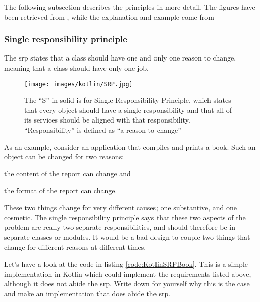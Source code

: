The following subsection describes the principles in more detail.
The figures have been retrieved from \cite{Devilla2009}, while the explanation and example come from \cite{OODesigncom2018,Janssen2018,Laanaya2016,Lipovetskii2017}

\subsubsection{Single responsibility principle }
\label{sec:srp}
\begin{framed}
The \gls{srp} states that a class should have one and only one reason to change, meaning that a class should have only one job.	
\end{framed}

\begin{figure}
	\centering
	\texttt{[image: images/kotlin/SRP.jpg]}
	\caption{The “S” in \gls{solid} is for Single Responsibility Principle, which states that every object should have a single responsibility and that all of its services should be aligned with that responsibility.
		“Responsibility” is defined as “a reason to change”}
	\label{fir:SRP}
\end{figure}

As an example, consider an application that compiles and prints a book.
Such an object can be changed for two reasons:
\begin{inparaenum}[(i)]
	\item the content of the report can change and
	\item the format of the report can change.
\end{inparaenum}
 These two things change for very different causes; one substantive, and one cosmetic.
The single responsibility principle says that these two aspects of the problem are really two separate responsibilities, and should therefore be in separate classes or modules.
It would be a bad design to couple two things that change for different reasons at different times.

\begin{exercise}
Let's have a look at the code in listing \ref{code:KotlinSRPBook}.
This is a simple implementation in Kotlin which could implement the requirements listed above, although it does not abide the \gls{srp}.
Write down for yourself why this is the case and make an implementation that does abide the \gls{srp}.
\end{exercise}



